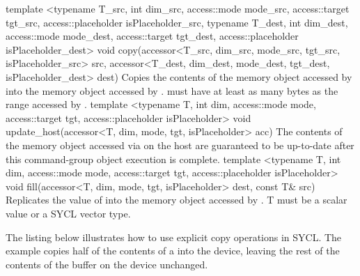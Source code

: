   \addRowTwoL
    {template <typename T_src, int dim_src, access::mode mode_src, access::target tgt_src, access::placeholder isPlaceholder_src, typename T_dest, int dim_dest, access::mode mode_dest, access::target tgt_dest, access::placeholder isPlaceholder_dest>}
    {void copy(accessor<T_src, dim_src, mode_src, tgt_src, isPlaceholder_src> src, accessor<T_dest, dim_dest, mode_dest, tgt_dest, isPlaceholder_dest> dest)}
    { Copies the contents of the memory object accessed by 
      into the memory object accessed by .
       must have at least as many bytes as the
      range accessed by .}
  \addRowTwoL
    {template <typename T, int dim, access::mode mode, access::target tgt, access::placeholder isPlaceholder>}
    {void update_host(accessor<T, dim, mode, tgt, isPlaceholder> acc)}
    { The contents of the memory object accessed via 
      on the host are guaranteed to be up-to-date after this
      \gls{command-group} object execution is complete.}
  \addRowThreeL
    {template <typename T, int dim, access::mode mode, access::target tgt, access::placeholder isPlaceholder>}
    {void fill(accessor<T, dim, mode, tgt, isPlaceholder> dest,}
    {          const T\& src)}
    {Replicates the value of  into the
      memory object accessed by .
      T must be a scalar value or a SYCL vector type.
    }

\completeTable

The listing below illustrates how to use explicit copy
operations in SYCL. The example copies half of the contents of
a  into the device, leaving the rest of the
contents of the buffer on the device unchanged.




